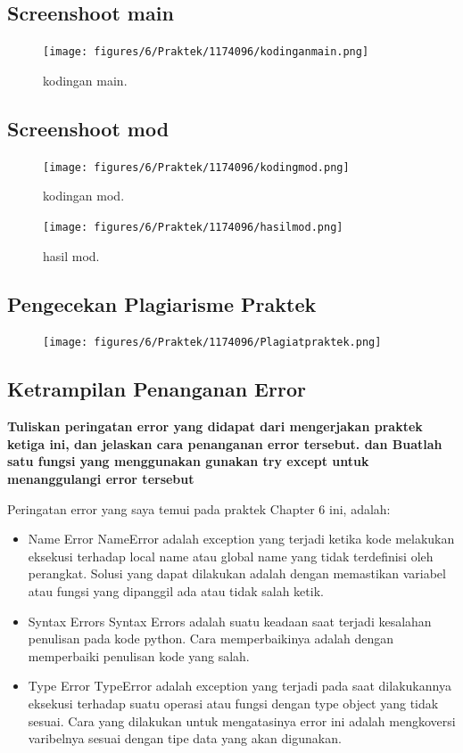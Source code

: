\subsection{Screenshoot main}
\begin{figure}[H]
	\texttt{[image: figures/6/Praktek/1174096/kodinganmain.png]}
	\caption{kodingan main.}
	\centering
\end{figure}

\subsection{Screenshoot mod}
\begin{figure}[H]
	\texttt{[image: figures/6/Praktek/1174096/kodingmod.png]}
	\caption{kodingan mod.}
	\centering
\end{figure}

\begin{figure}[H]
	\texttt{[image: figures/6/Praktek/1174096/hasilmod.png]}
	\caption{hasil mod.}
	\centering
\end{figure}

\subsection{Pengecekan Plagiarisme Praktek}
\begin{figure}[H]
	\texttt{[image: figures/6/Praktek/1174096/Plagiatpraktek.png]}
	\centering
\end{figure}

\subsection{Ketrampilan Penanganan Error}
\textbf{Tuliskan peringatan error yang didapat dari mengerjakan praktek ketiga ini, dan jelaskan cara penanganan error tersebut. dan Buatlah satu fungsi yang menggunakan gunakan try except untuk menanggulangi error tersebut}

Peringatan error yang saya temui pada praktek Chapter 6 ini, adalah:
\begin{itemize}
	\item Name Error
	NameError adalah exception yang terjadi ketika kode melakukan eksekusi terhadap local name atau global name yang tidak terdefinisi oleh perangkat. Solusi yang dapat dilakukan adalah dengan memastikan variabel atau fungsi yang dipanggil ada atau tidak salah ketik.
	
	\item Syntax Errors
	Syntax Errors adalah suatu keadaan saat  terjadi kesalahan penulisan pada kode python. Cara memperbaikinya adalah dengan memperbaiki penulisan kode yang salah.
	
	\item Type Error
	TypeError adalah exception yang terjadi pada saat dilakukannya eksekusi terhadap suatu operasi atau fungsi dengan type object yang tidak sesuai. Cara yang dilakukan untuk mengatasinya error ini adalah mengkoversi varibelnya sesuai dengan tipe data yang akan digunakan.
\end{itemize}

